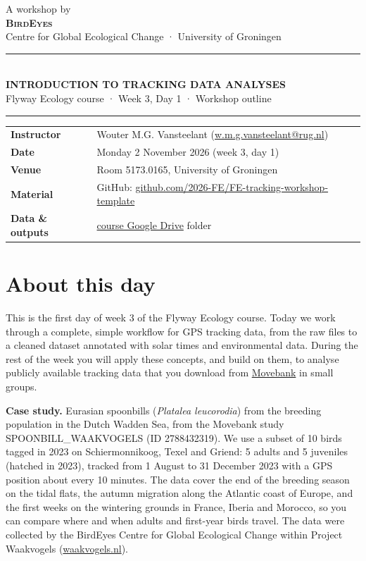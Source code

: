 \documentclass[11pt,a4paper]{article}
\begin{document}
\thispagestyle{empty}
{\color{bedark}
\vspace*{-0.6cm}
{\small A workshop by}\\[2pt]
{\Huge\bfseries\textsc{BirdEyes}}\\[1pt]
{\small Centre for Global Ecological Change · University of Groningen}\par}
\vspace{0.9cm}
{\color{bedark}\rule{\linewidth}{1.5pt}}\\[8pt]
{\LARGE\bfseries\color{bedark}\MakeUppercase{Introduction to tracking data analyses}}\\[6pt]
{\Large Flyway Ecology course · Week 3, Day 1 · Workshop outline}\\[6pt]
{\color{bedark}\rule{\linewidth}{1.5pt}}

\vspace{4pt}
\begin{tabular}{@{}ll}
\textbf{Instructor} & Wouter M.G. Vansteelant (\href{mailto:w.m.g.vansteelant@rug.nl}{w.m.g.vansteelant@rug.nl})\\
\textbf{Date} & Monday 2 November 2026 (week 3, day 1)\\
\textbf{Venue} & Room 5173.0165, University of Groningen\\
\textbf{Material} & GitHub: \href{https://github.com/2026-FE/FE-tracking-workshop-template}{github.com/2026-FE/FE-tracking-workshop-template}\\
\textbf{Data \& outputs} & \href{https://drive.google.com/drive/folders/1ijXcZ5Htpthri6gpWZAaoprk31PzBblI}{course Google Drive} folder\\
\end{tabular}

\section{About this day}

This is the first day of week 3 of the Flyway Ecology course. Today we work through a complete, simple workflow for GPS tracking data, from the raw files to a cleaned dataset annotated with solar times and environmental data. During the rest of the week you will apply these concepts, and build on them, to analyse publicly available tracking data that you download from \href{https://www.movebank.org}{Movebank} in small groups.

\textbf{Case study.} Eurasian spoonbills (\textit{Platalea leucorodia}) from the breeding population in the Dutch Wadden Sea, from the Movebank study SPOONBILL\_WAAKVOGELS (ID 2788432319). We use a subset of 10 birds tagged in 2023 on Schiermonnikoog, Texel and Griend: 5 adults and 5 juveniles (hatched in 2023), tracked from 1 August to 31 December 2023 with a GPS position about every 10 minutes. The data cover the end of the breeding season on the tidal flats, the autumn migration along the Atlantic coast of Europe, and the first weeks on the wintering grounds in France, Iberia and Morocco, so you can compare where and when adults and first-year birds travel. The data were collected by the BirdEyes Centre for Global Ecological Change within Project Waakvogels (\href{https://waakvogels.nl/trekvogels/lepelaar}{waakvogels.nl}).
\end{document}
